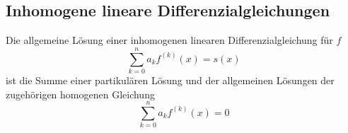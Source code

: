 \subsection{Inhomogene lineare Differenzialgleichungen}

Die allgemeine Lösung einer inhomogenen linearen Differenzialgleichung für $f$
$$\sum_{k=0}^n a_k f^{(k)}(x) = s(x)$$
ist die Summe einer partikulären Lösung und der allgemeinen Lösungen der
zugehörigen homogenen Gleichung
$$\sum_{k=0}^n a_k f^{(k)}(x) = 0$$
